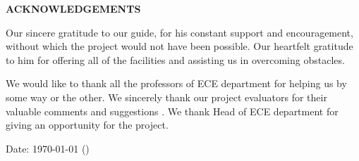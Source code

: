 \clearpage
\begin{centering}
\textbf{\Large ACKNOWLEDGEMENTS}\\
\vspace{\baselineskip}
\end{centering}

Our sincere gratitude to our guide, for his constant support and encouragement, without which the project would not have been possible.  Our heartfelt gratitude to him for offering all of the facilities and assisting us in overcoming obstacles.
\par{
We would like to thank all the professors of ECE department for helping us by some way or the other. We sincerely thank our project evaluators for their valuable comments and suggestions . We thank Head of ECE department for giving an opportunity for the project.
}


\vspace{4mm}
\noindent
Date: \today 
\mbox{}\hfill   {\yourName\; (\yourEnrollmentNumber)}




